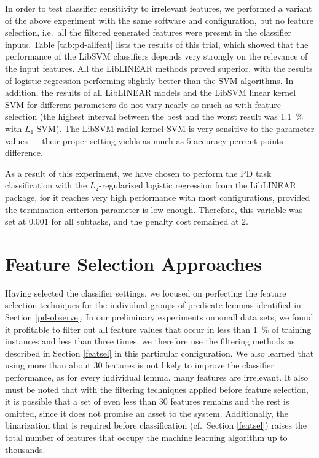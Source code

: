 \documentclass[12pt,notitlepage,a4paper]{report}
\begin{document}
In order to test classifier sensitivity to irrelevant features, we performed a variant of the above experiment with the same software and configuration, but no feature selection, i.e.\ all the filtered generated features were present in the classifier inputs. Table \ref{tab:pd-allfeat} lists the results of this trial, which showed that the performance of the LibSVM classifiers depends very strongly on the relevance of the input features. All the LibLINEAR methods proved superior, with the results of logistic regression performing slightly better than the SVM algorithms. In addition, the results of all LibLINEAR models and the LibSVM linear kernel SVM for different parameters do not vary nearly as much as with feature selection (the highest interval between the best and the worst result was 1.1~\% with $L_1$-SVM). The LibSVM radial kernel SVM is very sensitive to the parameter values --- their proper setting yields as much as $5$ accuracy percent points difference.

As a result of this experiment, we have chosen to perform the PD task classification with the $L_2$-regularized logistic regression from the LibLINEAR package, for it reaches very high performance with most configurations, provided the termination criterion parameter is low enough. Therefore, this variable was set at $0.001$ for all subtasks, and the penalty cost remained at $2$.

\section{Feature Selection Approaches}\label{pd-training}

Having selected the classifier settings, we focused on perfecting the feature selection techniques for the individual groups of predicate lemmas identified in Section \ref{pd-observe}. In our preliminary experiments on small data sets, we found it profitable to filter out all feature values that occur in less than 1~\% of training instances and less than three times, we therefore use the filtering methods as described in Section \ref{featsel} in this particular configuration. We also learned that using more than about 30 features is not likely to improve the classifier performance, as for every individual lemma, many features are irrelevant. It also must be noted that with the filtering techniques applied before feature selection, it is possible that a set of even less than 30 features remains and the rest is omitted, since it does not promise an asset to the system. Additionally, the binarization that is required before classification (cf.\ Section \ref{featsel}) raises the total number of features that occupy the machine learning algorithm up to thousands.
\end{document}
